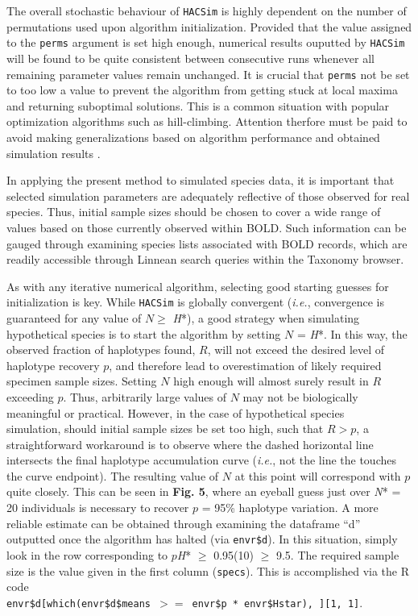 The overall stochastic behaviour of {\tt HACSim} is highly dependent on the number of \\ permutations used upon algorithm initialization. Provided that the value assigned to the {\tt  perms} argument is set high enough, numerical results ouputted by {\tt HACSim} will be found to be quite consistent between consecutive runs whenever all remaining parameter values remain unchanged. It is crucial that {\tt perms} not be set to too low a value to prevent the algorithm from getting stuck at local maxima and returning suboptimal solutions. This is a common situation with popular optimization algorithms such as hill-climbing. Attention therfore must be paid to avoid making generalizations based on algorithm performance and obtained simulation results \cite{spall2012stochastic}.

In applying the present method to simulated species data, it is important that selected simulation parameters are adequately reflective of those observed for real species. Thus, initial sample sizes should be chosen to cover a wide range of values based on those currently observed within BOLD. Such information can be gauged through examining species lists associated with BOLD records, which are readily accessible through Linnean search queries within the Taxonomy browser.

As with any iterative numerical algorithm, selecting good starting guesses for \\ initialization is key. While {\tt HACSim} is globally convergent (\textit{i.e.}, convergence is guaranteed for any value of $N \geq$ \textit{H}*), a good strategy when simulating hypothetical species is to start the algorithm by setting $N$ = \textit{H}*. In this way, the observed fraction of haplotypes found, $R$, will not exceed the desired level of haplotype recovery $p$, and therefore lead to overestimation of likely required specimen sample sizes. Setting $N$ high enough will almost surely result in $R$ exceeding $p$. Thus, arbitrarily large values of $N$ may not be biologically meaningful or practical. However, in the case of hypothetical species \\ simulation, should initial sample sizes be set too high, such that $R > p$, a straightforward workaround is to observe where the dashed horizontal line intersects the final haplotype accumulation curve (\textit{i.e.}, not the line the touches the curve endpoint). The resulting value of $N$ at this point will correspond with $p$ quite closely. This can be seen in \textbf{Fig. 5}, where an eyeball guess just over \textit{N}* = 20 individuals is necessary to recover $p$ = 95\% haplotype variation. A more reliable estimate can be obtained through examining the dataframe ``d'' outputted once the algorithm has halted (via {\tt envr\$d}). In this situation, simply look in the row corresponding to $p$\textit{H}* $\geq$ 0.95(10) $\geq$ 9.5. The required sample size is the value given in the first column ({\tt specs}). This is accomplished via the R code \\ {\tt envr\$d[which(envr\$d\$means $>=$ envr\$p * envr\$Hstar), ][1, 1]}.

